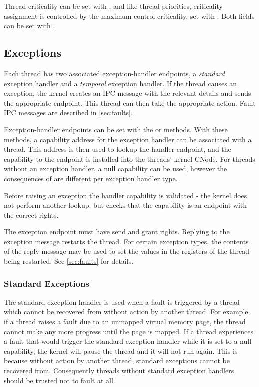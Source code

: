 Thread criticality can be set with , and like thread priorities, criticality assignment is controlled by the maximum control criticality, set with . 
Both fields can be set with .

\subsection{Exceptions}
\label{sec:exceptions}

Each thread has two associated exception-handler endpoints, a \emph{standard} exception handler and a \emph{temporal} exception handler.
If the thread
causes an exception, the kernel creates an IPC message with the relevant
details and sends the appropriate endpoint. This
thread can then take the appropriate action. Fault IPC messages are
described in \autoref{sec:faults}.

Exception-handler
endpoints can be set with the  or
 methods.
With these methods, a capability address for the exception handler can be associated with a thread.
This address is then used to lookup the handler endpoint, and the capability to the endpoint is installed into the threads' kernel CNode.
For threads without an exception handler, a null capability can be used, however the consequences of are different per exception handler type.

Before raising an exception the handler capability is validated - the kernel does not perform another lookup, but checks that the capability is an endpoint with the correct rights.

The exception endpoint must have send and grant rights. Replying to the
exception message restarts the thread. For certain exception types, the contents of
the reply message may be used to set the values in the registers of the
thread being restarted.
See \autoref{sec:faults} for details.

\subsubsection{Standard Exceptions}

The standard exception handler is used when a fault is triggered by a thread which cannot be recovered from without action by another thread.
For example, if a thread raises a fault due to an unmapped virtual memory page, the thread cannot make any more progress until the page is mapped.
If a thread experiences a fault that would trigger the standard exception handler while it is set to a null capability, the kernel will pause the thread and it will not run again. 
This is because without action by another thread, standard exceptions cannot be recovered from.
Consequently threads without standard exception handlers should be trusted not to fault at all.

